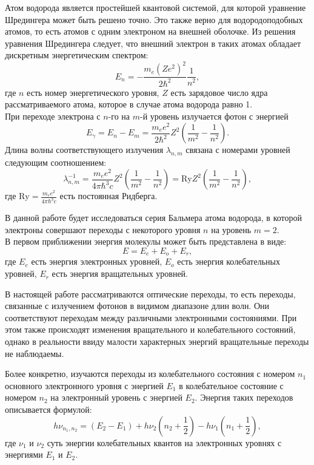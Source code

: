 \documentclass[a4paper, 12pt]{article}%
\begin{document}
	Атом водорода является простейшей квантовой системой, для которой уравнение Шредингера может быть решено точно. Это также верно для водородоподобных атомов, то есть атомов с одним электроном на внешней оболочке. Из решения уравнения Шредингера следует, что внешний электрон в таких атомах обладает дискретным энергетическим спектром:  
	\begin{equation}
		E_n = - \frac{m_e (Z e^2)^2}{2\hbar^2}\frac{1}{n^2},
	\end{equation}
	где $n$ есть номер энергетического уровня, $Z$ есть зарядовое число ядра рассматриваемого атома, которое в случае атома водорода равно 1.\\
	При переходе электрона с $n$-го на $m$-й уровень излучается фотон с энергией
	\begin{equation}
		E_\gamma = E_n - E_m = \frac{m_ee^2}{2\hbar^2}Z^2\left(\frac{1}{m^2} - \frac{1}{n^2}\right).
	\end{equation}
	Длина волны  соответствующего излучения $\lambda_{n,m}$ связана с номерами уровней следующим соотношением:
	\begin{equation}
		\label{eq:Ry}
		\lambda_{n,m}^{-1} =\frac{m_ee^2}{4\pi\hbar^3c}Z^2\left(\frac{1}{m^2}-\frac{1}{n^2}\right) = \text{Ry} Z^2 \left(\frac{1}{m^2}-\frac{1}{n^2}\right),
	\end{equation}
	где $\text{Ry} = \frac{m_ee^2}{4\pi\hbar^3c}$ есть постоянная Ридберга.
	
	В данной работе будет исследоваться серия Бальмера атома водорода, в которой электроны совершают переходы с некоторого уровня $n$ на уровень $m = 2$.\\

	В первом приближении энергия молекулы может быть представлена в виде:
	\begin{equation}
		E=E_e+E_o+E_r,
	\end{equation}
	где $E_e$ есть энергия электронных уровней, $E_o$ есть энергия колебательных уровней, $E_r$ есть энергия вращательных уровней.
	
	В настоящей работе рассматриваются оптические переходы, то есть переходы, связанные с излучением фотонов в видимом диапазоне длин волн. Они соответствуют переходам между различными электронными состояниями. При этом также происходят изменения вращательного и колебательного состояний, однако в реальности ввиду малости характерных энергий вращательные переходы не наблюдаемы.
	
	Более конкретно, изучаются переходы из колебательного состояния с номером $n_1$ основного электронного уровня с энергией $E_1$ в колебательное состояние с номером $n_2$ на электронный уровень с энергией $E_2$. Энергия таких переходов описывается формулой:
	\begin{equation}
		h \nu_{n_1,n_2}=(E_2-E_1)+h\nu_2(n_2+\dfrac{1}{2})-h \nu_1(n_1+\dfrac{1}{2}),
	\end{equation}
	где $\nu_1$ и $\nu_2$ суть энергии колебательных квантов на электронных уровнях с энергиями $E_1$ и $E_2$.
	
\end{document}
